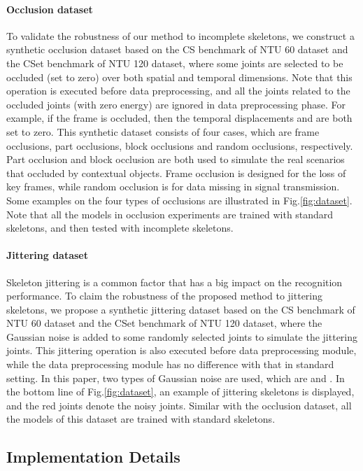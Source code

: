 \documentclass[journal]{IEEEtran}
\begin{document}
\paragraph{Occlusion dataset} To validate the robustness of our method to incomplete skeletons, we construct a synthetic occlusion dataset based on the CS benchmark of NTU 60 dataset and the CSet benchmark of NTU 120 dataset, where some joints are selected to be occluded (set to zero) over both spatial and temporal dimensions. Note that this operation is executed before data preprocessing, and all the joints related to the occluded joints (with zero energy) are ignored in data preprocessing phase. For example, if the frame  is occluded, then the temporal displacements  and  are both set to zero. This synthetic dataset consists of four cases, which are frame occlusions, part occlusions, block occlusions and random occlusions, respectively. Part occlusion and block occlusion are both used to simulate the real scenarios that occluded by contextual objects. Frame occlusion is designed for the loss of key frames, while random occlusion is for data missing in signal transmission. Some examples on the four types of occlusions are illustrated in Fig.\ref{fig:dataset}. Note that all the models in occlusion experiments are trained with standard skeletons, and then tested with incomplete skeletons.

\paragraph{Jittering dataset} Skeleton jittering is a common factor that has a big impact on the recognition performance. To claim the robustness of the proposed method to jittering skeletons, we propose a synthetic jittering dataset based on the CS benchmark of NTU 60 dataset and the CSet benchmark of NTU 120 dataset, where the Gaussian noise  is added to some randomly selected joints to simulate the jittering joints. This jittering operation is also executed before data preprocessing module, while the data preprocessing module has no difference with that in standard setting. In this paper, two types of Gaussian noise are used, which are  and . In the bottom line of Fig.\ref{fig:dataset}, an example of jittering skeletons is displayed, and the red joints denote the noisy joints. Similar with the occlusion dataset, all the models of this dataset are trained with standard skeletons.

\subsection{Implementation Details}
\label{ssec:details}
\end{document}
